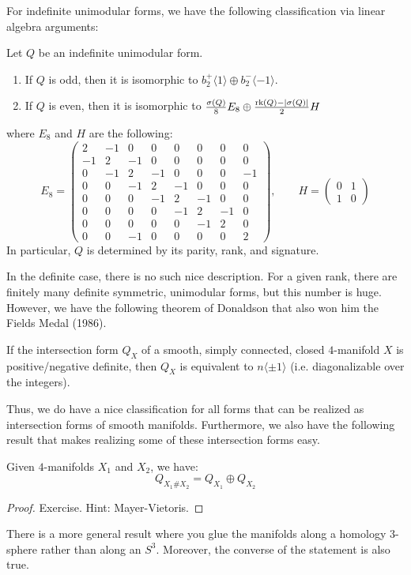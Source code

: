 \documentclass[12pt]{article}
\begin{document}
For indefinite unimodular forms, we have the following classification via linear algebra arguments:
\begin{theorem}
    Let $Q$ be an indefinite unimodular form. 
    \begin{enumerate}
        \item If $Q$ is odd, then it is isomorphic to $b_2^+\langle 1 \rangle \oplus b_2^{-}\langle -1 \rangle$.
        \item If $Q$ is even, then it is isomorphic to $\frac{\sigma(Q)}{8}E_8 \oplus \frac{\operatorname{rk}(Q) - |\sigma(Q)|}{2}H$
    \end{enumerate} 
    where $E_8$ and $H$ are the following: 
    \[
    E_8 =
    \begin{pmatrix}
    2 & -1 & 0 & 0 & 0 & 0 & 0 & 0 \\
    -1 & 2 & -1 & 0 & 0 & 0 & 0 & 0 \\
    0 & -1 & 2 & -1 & 0 & 0 & 0 & -1 \\
    0 & 0 & -1 & 2 & -1 & 0 & 0 & 0 \\
    0 & 0 & 0 & -1 & 2 & -1 & 0 & 0 \\
    0 & 0 & 0 & 0 & -1 & 2 & -1 & 0 \\
    0 & 0 & 0 & 0 & 0 & -1 & 2 & 0 \\
    0 & 0 & -1 & 0 & 0 & 0 & 0 & 2
    \end{pmatrix}, \qquad 
    H = \begin{pmatrix}
        0 & 1 \\
        1 & 0
    \end{pmatrix}  
    \]
    In particular, $Q$ is determined by its parity, rank, and signature. 
\end{theorem}

In the definite case, there is no such nice description. For a given rank, there are finitely many definite symmetric, unimodular forms, but this number is huge. However, we have the following theorem of Donaldson that also won him the Fields Medal (1986).
\begin{theorem}[Donaldson]
    If the intersection form $Q_X$ of a smooth, simply connected, closed $4$-manifold $X$ is positive/negative definite, then $Q_X$ is equivalent to $n\langle \pm 1\rangle$ (i.e. diagonalizable over the integers). 
\end{theorem}

Thus, we do have a nice classification for all forms that can be realized as intersection forms of smooth manifolds. Furthermore, we also have the following result that makes realizing some of these intersection forms easy.
\begin{lemma}
    Given $4$-manifolds $X_1$ and $X_2$, we have:
    \[ Q_{X_1 \# X_2} = Q_{X_1} \oplus Q_{X_2}\]
\end{lemma}
\begin{proof}
    Exercise. Hint: Mayer-Vietoris.
\end{proof}
\begin{remark}
    There is a more general result where you glue the manifolds along a homology $3$-sphere rather than along an $S^3$. Moreover, the converse of the statement is also true.
\end{remark}
\end{document}

